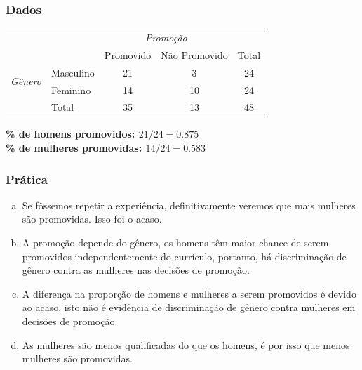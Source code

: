 
\begin{frame}
\frametitle{Dados}
\justifying
{}

\begin{center}
\begin{tabular}{ll  cc c} 
  		&				& \multicolumn{2}{c}{\textit{Promoção}} \\
\cline{3-4}
							&			& Promovido	& Não Promovido 	& Total	\\
\cline{2-5}
\multirow{2}{*}{\textit{Gênero	}}	&Masculino 		& 21	 	& 3		& 24 	\\
							&Feminino		& 14	 	& 10 	 	& 24 \\
\cline{2-5}
							&Total		& 35		& 13		& 48 \\
\end{tabular}
\end{center}

\pause

\textbf{\% de homens promovidos: $21 / 24 = 0.875$} \\
\textbf{\% de mulheres promovidas: $14 / 24 = 0.583$}

\end{frame}


\begin{frame}
\frametitle{Prática}
\justifying
{}
\vspace{-0.5cm}
\small{
\begin{enumerate}[(a)]
\justifying
\item Se fôssemos repetir a experiência, definitivamente veremos que mais mulheres são promovidas. Isso foi o acaso.
\justifying
\item A promoção depende do gênero, os homens têm maior chance de serem promovidos independentemente do currículo, portanto, há discriminação de gênero contra as mulheres nas decisões de promoção. 
\justifying
\item A diferença na proporção de homens e mulheres a serem promovidos é devido ao acaso, isto não é evidência de discriminação de gênero contra mulheres em decisões de promoção. 
\justifying
\item As mulheres são menos qualificadas do que os homens, é por isso que menos mulheres são promovidas.

\end{enumerate}
}
\end{frame}

